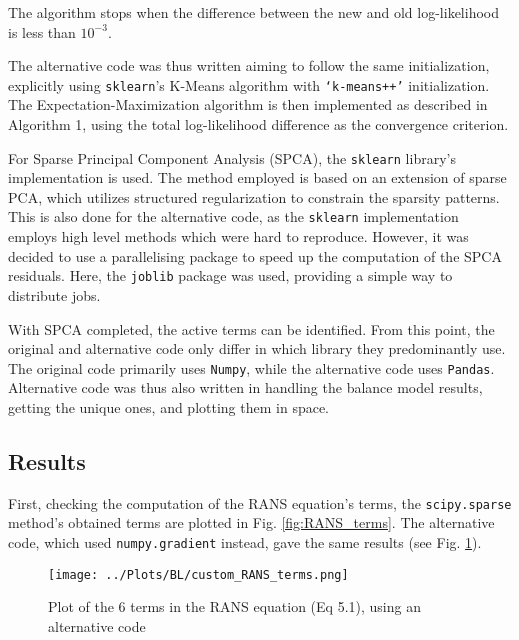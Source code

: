 \documentclass[12pt]{report} %
\begin{document}
The algorithm stops when the difference between the new and old log-likelihood is less than $10^{-3}$.

The alternative code was thus written aiming to follow the same initialization, explicitly using \texttt{sklearn}’s K-Means algorithm with \texttt{‘k-means++’} initialization. The Expectation-Maximization algorithm is then implemented as described in Algorithm 1, using the total log-likelihood difference as the convergence criterion.

For Sparse Principal Component Analysis (SPCA), the \texttt{sklearn} library’s implementation is used. The method employed is based on an extension of sparse PCA, which utilizes structured regularization to constrain the sparsity patterns. This is also done for the alternative code, as the \texttt{sklearn} implementation employs high level methods which were hard to reproduce\cite{jenatton2010structured,mairal2010online}. However, it was decided to use a parallelising package to speed up the computation of the SPCA residuals. Here, the \texttt{joblib} package was used, providing a simple way to distribute jobs\cite{joblib}.

With SPCA completed, the active terms can be identified. From this point, the original and alternative code only differ in which library they predominantly use. The original code primarily uses \texttt{Numpy}, while the alternative code uses \texttt{Pandas}. Alternative code was thus also written in handling the balance model results, getting the unique ones, and plotting them in space.


\subsection{Results}

First, checking the computation of the RANS equation's terms, the \texttt{scipy.sparse} method's obtained terms are plotted in Fig. \ref{fig:RANS_terms}. The alternative code, which used \texttt{numpy.gradient} instead, gave the same results (see Fig. \ref{fig:custom_RANS_terms}).

\begin{figure}[htbp]
  \centering
  \texttt{[image: ../Plots/BL/custom\_RANS\_terms.png]}
  \caption{Plot of the 6 terms in the RANS equation (Eq 5.1), using an alternative code}
  \label{fig:custom_RANS_terms}
\end{figure}
\end{document}
